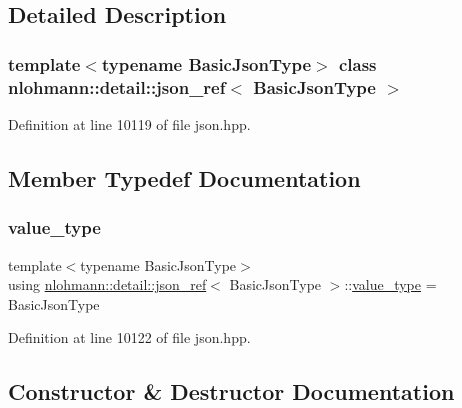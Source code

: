 \subsection{Detailed Description}
\subsubsection*{template$<$typename Basic\+Json\+Type$>$\newline
class nlohmann\+::detail\+::json\+\_\+ref$<$ Basic\+Json\+Type $>$}



Definition at line 10119 of file json.\+hpp.



\subsection{Member Typedef Documentation}
\mbox{\label{classnlohmann_1_1detail_1_1json__ref_a78d76cf288141049568c0d670ed670ef}} 
\subsubsection{\texorpdfstring{value\+\_\+type}{value\_type}}
{\footnotesize\ttfamily template$<$typename Basic\+Json\+Type$>$ \\
using \hyperlink{classnlohmann_1_1detail_1_1json__ref}{nlohmann\+::detail\+::json\+\_\+ref}$<$ Basic\+Json\+Type $>$\+::\hyperlink{classnlohmann_1_1detail_1_1json__ref_a78d76cf288141049568c0d670ed670ef}{value\+\_\+type} =  Basic\+Json\+Type}



Definition at line 10122 of file json.\+hpp.



\subsection{Constructor \& Destructor Documentation}
\mbox{\label{classnlohmann_1_1detail_1_1json__ref_ae1adf5bcee8b6fa0c358710604fb1938}} 
